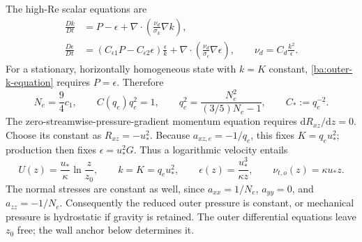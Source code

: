 \documentclass[11pt,a4paper]{article}
\numberwithin{equation}{section}
\begin{document}
The high-Re scalar equations are
\begin{align}
 \frac{Dk}{Dt}
 &=P-\epsilon+\nabla\cdot
       \left(\frac{\nu_d}{\sigma_k}\nabla k\right),
 \label{ba:outer-k-equation}\\
 \frac{D\epsilon}{Dt}
 &=(C_{\epsilon1}P-C_{\epsilon2}\epsilon)\frac{\epsilon}{k}
   +\nabla\cdot\left(\frac{\nu_d}{\sigma_\epsilon}\nabla\epsilon\right),
 \qquad \nu_d=C_d\frac{k^2}{\epsilon}.
 \label{ba:outer-epsilon-equation}
\end{align}
For a stationary, horizontally homogeneous state with $k=K$ constant,
\eqref{ba:outer-k-equation} requires $P=\epsilon$. Therefore
\begin{equation}
 N_e=\frac94c_1,\qquad
 C(q_e)q_e^2=1,\qquad
 q_e^2=\frac{N_e^2}{(3/5)N_e-1},\qquad
 C_*:=q_e^{-2}.
 \label{ba:outer-equilibrium-root}
\end{equation}
The zero-streamwise-pressure-gradient momentum equation requires
$\mathrm dR_{xz}/\mathrm dz=0$. Choose its constant as
$R_{xz}=-u_*^2$. Because $a_{xz,e}=-1/q_e$, this fixes
$K=q_eu_*^2$; production then fixes $\epsilon=u_*^2G$.
Thus a logarithmic velocity entails
\begin{equation}
 U(z)=\frac{u_*}{\kappa}\ln\frac z{z_0},\qquad
 k=K=q_eu_*^2,\qquad
 \epsilon(z)=\frac{u_*^3}{\kappa z},\qquad
 \nu_{t,o}(z)=\kappa u_*z.
 \label{ba:outer-log-family}
\end{equation}
The normal stresses are constant as well, since
$a_{xx}=1/N_e$, $a_{yy}=0$, and $a_{zz}=-1/N_e$.
Consequently the reduced outer pressure is constant, or mechanical
pressure is hydrostatic if gravity is retained. The outer differential
equations leave $z_0$ free; the wall anchor below determines it.
\end{document}
